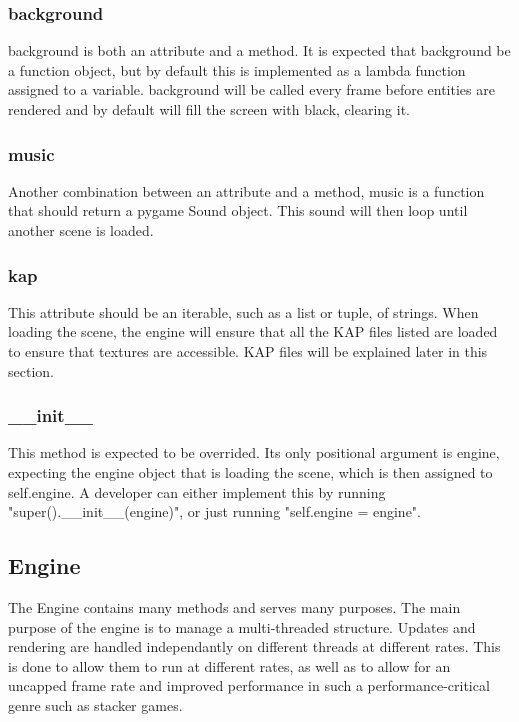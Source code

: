 \documentclass{report}
\begin{document}
\subsubsection{background}

background is both an attribute and a method. It is expected that background be a function object, but by default this is implemented as a lambda function assigned to a variable. background will be called every frame before entities are rendered and by default will fill the screen with black, clearing it.

\subsubsection{music}

Another combination between an attribute and a method, music is a function that should return a pygame Sound object. This sound will then loop until another scene is loaded.

\subsubsection{kap}

This attribute should be an iterable, such as a list or tuple, of strings. When loading the scene, the engine will ensure that all the KAP files listed are loaded to ensure that textures are accessible. KAP files will be explained later in this section.

\subsubsection{\_\_init\_\_}

This method is expected to be overrided. Its only positional argument is engine, expecting the engine object that is loading the scene, which is then assigned to self.engine. A developer can either implement this by running "super().\_\_init\_\_(engine)", or just running "self.engine = engine".

\subsection{Engine}

The Engine contains many methods and serves many purposes. The main purpose of the engine is to manage a multi-threaded structure. Updates and rendering are handled independantly on different threads at different rates. This is done to allow them to run at different rates, as well as to allow for an uncapped frame rate and improved performance in such a performance-critical genre such as stacker games.
\end{document}
